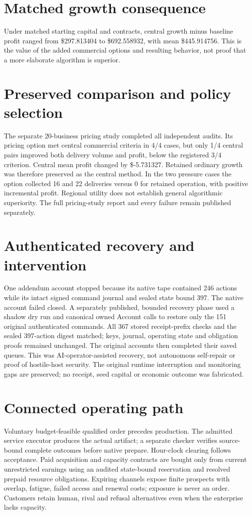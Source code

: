 \documentclass[10pt,letterpaper]{article}
\begin{document}
\section{Matched growth consequence}
Under matched starting capital and contracts, central growth minus baseline profit ranged from \$297.813404 to \$692.558932, with mean \$445.914756. This is the value of the added commercial options and resulting behavior, not proof that a more elaborate algorithm is superior.
\section{Preserved comparison and policy selection}
The separate 20-business pricing study completed all independent audits. Its pricing option met central commercial criteria in 4/4 cases, but only 1/4 central pairs improved both delivery volume and profit, below the registered 3/4 criterion. Central mean profit changed by \$-5.731327. Retained ordinary growth was therefore preserved as the central method. In the two pressure cases the option collected 16 and 22 deliveries versus 0 for retained operation, with positive incremental profit. Regional utility does not establish general algorithmic superiority. The full pricing-study report and every failure remain published separately.
\section{Authenticated recovery and intervention}
One addendum account stopped because its native tape contained 246 actions while its intact signed command journal and sealed state bound 397. The native account failed closed. A separately published, bounded recovery phase used a shadow dry run and canonical owned Account calls to restore only the 151 original authenticated commands. All 367 stored receipt-prefix checks and the sealed 397-action digest matched; keys, journal, operating state and obligation proofs remained unchanged. The original accounts then completed their saved queues. This was AI-operator-assisted recovery, not autonomous self-repair or proof of hostile-host security. The original runtime interruption and monitoring gaps are preserved; no receipt, seed capital or economic outcome was fabricated.
\section{Connected operating path}
Voluntary budget-feasible qualified order precedes production. The admitted service executor produces the actual artifact; a separate checker verifies source-bound complete outcomes before native prepare. Hour-clock clearing follows acceptance. Paid acquisition and capacity contracts are bought only from current unrestricted earnings using an audited state-bound reservation and resolved prepaid resource obligations. Expiring channels expose finite prospects with overlap, fatigue, failed access and renewal costs; exposure is never an order. Customers retain human, rival and refusal alternatives even when the enterprise lacks capacity.
\end{document}
